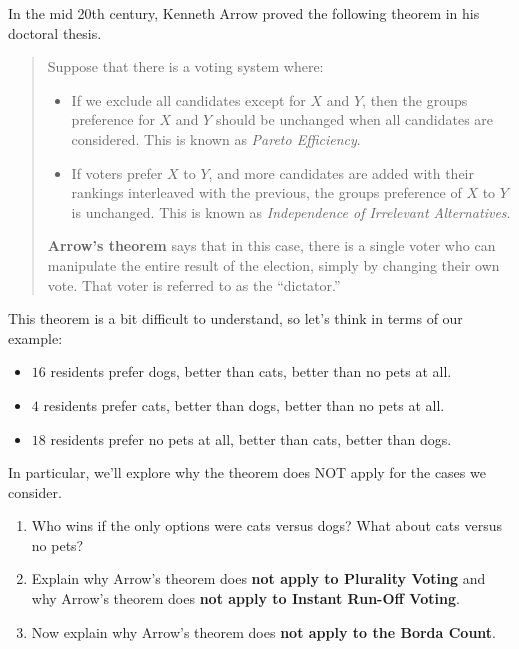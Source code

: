 \documentclass[nooutcomes,noauthor,hints,handout]{ximera}
\begin{document}
\begin{question}
  In the mid 20th century, Kenneth Arrow proved the following theorem in his doctoral thesis.
 \begin{mdframed}[style=OutcomeStyle]
  \begin{quote}
    Suppose that there is a voting system where:
    \begin{itemize}
    \item If we exclude all candidates except for $X$ and $Y$, then
      the groups preference for $X$ and $Y$ should be unchanged when
      all candidates are considered. This is known as \textit{Pareto
        Efficiency}.
    \item If voters prefer $X$ to $Y$, and more candidates are added
      with their rankings interleaved with the previous, the groups
      preference of $X$ to $Y$ is unchanged. This is known as
      \textit{Independence of Irrelevant Alternatives}.
    \end{itemize}
    \textbf{Arrow's theorem} says that in this case,
    there is a single voter who can manipulate the entire result of
    the election, simply by changing their own vote.  That voter is
    referred to as the ``dictator.''
  \end{quote}
 \end{mdframed}
This theorem is a bit difficult to understand, so let's think in terms
of our example:
\begin{itemize}
\item $16$ residents prefer dogs, better than cats, better than no pets at all.
\item $4$ residents prefer cats, better than dogs, better than no pets at all.
\item $18$ residents prefer no pets at all, better than cats, better
  than dogs.
\end{itemize}
In particular, we'll explore why the theorem does NOT apply for the cases we consider. 
\begin{enumerate}
\item Who wins if the only options were cats versus dogs? What about
  cats versus no pets?
\item Explain why Arrow's theorem does \textbf{not apply to Plurality Voting} and
  why Arrow's theorem does \textbf{not apply to Instant Run-Off Voting}.
\item Now explain why Arrow's theorem does \textbf{not apply to the Borda Count}.
\end{enumerate}

\end{question}
\mynewpage
\end{document}
